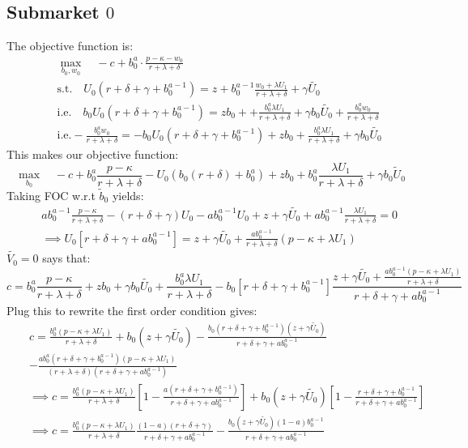 \documentclass[12pt]{article} %
\theoremstyle{definition}
\begin{document}
\subsection{Submarket $0$}
The objective function is: 
\begin{eqnarray*}
&& \max_{b_0,w_0} \quad -c + b_0^a \cdot \frac{p-\kappa-w_0}{r+\lambda+\delta} \\
&& \text{s.t.} \quad U_0(r+\delta+\gamma+b_0^{a-1}) = z + b_0^{a-1} \frac{w_0+\lambda U_1}{r+\lambda+\delta} + \gamma \tilde{U_0} \\
&& \text{i.e.} \quad b_0 U_0(r+\delta+\gamma+b_0^{a-1})  = zb_0 + + \frac{b_0^{a} \lambda U_1}{r+\lambda+\delta} +  \gamma b_0 \tilde{U_0} + \frac{b_0^{a}w_0}{r+\lambda+\delta}  \\
&& \text{i.e.} - \frac{b_0^{a}w_0}{r+\lambda+\delta} = - b_0 U_0(r+\delta+\gamma+b_0^{a-1}) + zb_0 +  \frac{b_0^{a} \lambda U_1}{r+\lambda+\delta} +  \gamma b_0 \tilde{U_0}   
\end{eqnarray*}
This makes our objective function: 
\begin{equation*}
\max_{b_0} \quad -c + b_0^a \frac{p-\kappa}{r+\lambda+\delta} - U_0(b_0(r+
\delta)+b_0^a) +  zb_0 +b_0^a \frac{\lambda U_1}{r+\lambda+\delta} + \gamma b_0 \tilde{U}_0
\end{equation*}
Taking FOC w.r.t $\tilde{b}_0$ yields: 
\begin{eqnarray*}
&& a b_0^{a-1}\frac{p-\kappa}{r+\lambda+\delta} - (r+\delta+\gamma) U_0 - a b_0^{a-1}U_0 + z + \gamma \tilde{U_0} + ab_0^{a-1} \frac{\lambda U_1}{r+\lambda+\delta} = 0 \\
&& \implies U_0[r+\delta+\gamma+ab_0^{a-1}] = z + \gamma \tilde{U_0} + \frac{a b_0^{a-1}}{r+\lambda+\delta}(p-\kappa+\lambda U_1)
\end{eqnarray*}
$\tilde{V_0}=0$ says that:
\begin{equation*}
 c =  b_0^{a} \frac{p-\kappa}{r+\lambda+\delta} + z b_0 + \gamma b_0 \tilde{U_0} + \frac{b_0^{a}\lambda U_1}{r+\lambda+\delta} -b_0[r+\delta+\gamma+b_0^{a-1}] \frac{z+\gamma \tilde{U_0} + \frac{ab_0^{a-1}(p-\kappa+\lambda U_1)}{r+\lambda+\delta}}{r+\delta+\gamma+ab_0^{a-1}}
\end{equation*}
Plug this to rewrite the first order condition gives: 
\begin{eqnarray*}
&& c =  \frac{b_0^a(p-\kappa+\lambda U_1)}{r+\lambda+\delta} + {b}_0 (z+\gamma \tilde{U_0}) - \frac{b_0(r+\delta+\gamma+b_0^{a-1})(z+\gamma \tilde{U_0})}{r+\delta+\gamma+ab_0^{a-1}} \\
&&- \frac{ab_0^a (r+\delta+\gamma+b_0^{a-1})(p-\kappa+\lambda U_1)}{({r+\lambda+\delta})(r+\delta+\gamma+ab_0^{a-1})} \\
&& \implies c =  \frac{b_0^a(p-\kappa+\lambda U_1)}{r+\lambda+\delta} \left[1 - \frac{a(r+\delta+\gamma+b_0^{a-1})}{r+\delta+\gamma+ab_0^{a-1}}\right]+ {b}_0 (z+\gamma \tilde{U_0}) \left[1 - \frac{r+\delta+\gamma+b_0^{a-1}}{r+\delta+\gamma+ab_0^{a-1}}\right] \\
&& \implies c =  \frac{b_0^a(p-\kappa+\lambda U_1)}{r+\lambda+\delta} \frac{(1-a)(r+\delta+\gamma)}{r+\delta+\gamma+ab_0^{a-1}} - \frac{{b}_0 (z+\gamma \tilde{U_0})(1-a)b_0^{a-1}}{r+\delta+\gamma+ab_0^{a-1}}
\end{eqnarray*}
\end{document}
